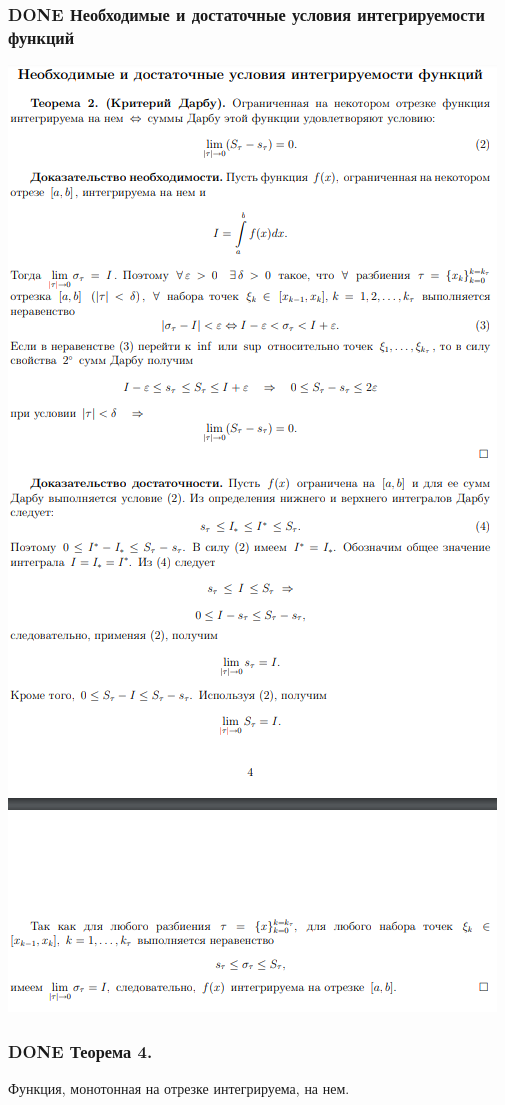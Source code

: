 \documentclass[11pt]{article}
\begin{document}
\subsubsection{{\bfseries\sffamily DONE} Необходимые и достаточные условия интегрируемости функций}
\label{sec:org77f1d40}
\begin{center}
\includegraphics[width=.9\linewidth]{img/b2-ndyintf.png}
\end{center}

\subsubsection{{\bfseries\sffamily DONE} Теорема 4.}
\label{sec:org9198b5a}
Функция, монотонная на отрезке интегрируема, на нем.
\end{document}
